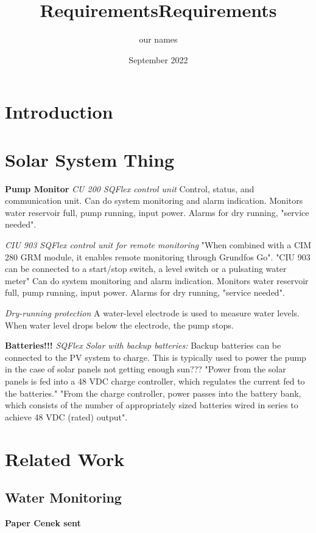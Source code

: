 \documentclass[12pt, letterpaper]{article}
\title{Requirements}
\author{our names}
\date{September 2022}
\begin{document}
\maketitle
\pagestyle{plain}

\title{Requirements}

\section{Introduction}

\section{Solar System Thing}
%
\textbf{Pump Monitor}
\textit{CU 200 SQFlex control unit}
%
Control, status, and communication unit.
%
Can do system monitoring and alarm indication.
%
Monitors water reservoir full, pump running, input power.
%
Alarms for dry running, "service needed".

%
\textit{CIU 903 SQFlex control unit for remote monitoring}
%
"When combined with a CIM 280 GRM module, it enables remote monitoring through Grundfos Go".
%
"CIU 903 can be connected to a start/stop switch, a level switch or a pulsating water meter"
%
Can do system monitoring and alarm indication.
%
Monitors water reservoir full, pump running, input power.
%
Alarms for dry running, "service needed".

\textit{Dry-running protection}
%
A water-level electrode is used to measure water levels.
%
When water level drops below the electrode, the pump stops.

\textbf{Batteries!!!}
%
\textit{SQFlex Solar with backup batteries:} Backup batteries can be connected to the PV system
to charge.
%
This is typically used to power the pump in the case of solar panels not getting enough sun???
%
"Power from the solar panels is fed into a 48 VDC charge controller, which regulates the current fed to the batteries."
%
"From the charge controller, power passes into the battery bank, which consists of the number of
appropriately sized batteries wired in series to achieve 48 VDC (rated) output".


\section{Related Work}
\subsection{Water Monitoring}
\textbf{Paper Cenek sent}
%
\end{document}
